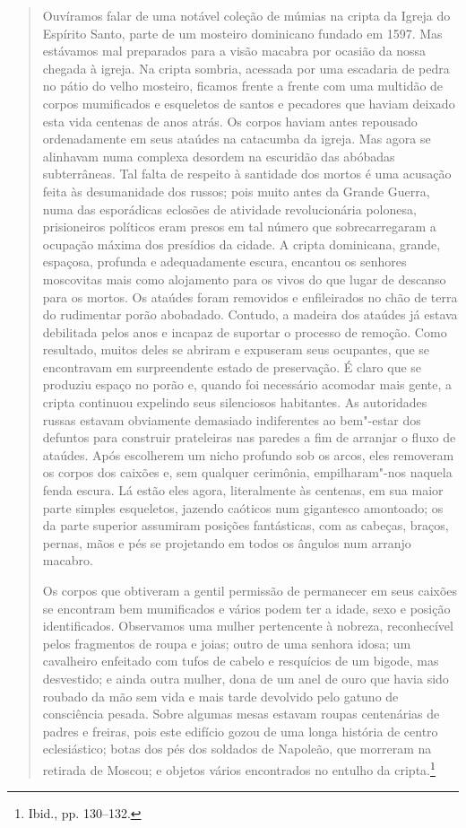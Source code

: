 \begin{quote}
Ouvíramos falar de uma notável coleção de múmias na cripta da Igreja do
Espírito Santo, parte de um mosteiro dominicano fundado em 1597. Mas
estávamos mal preparados para a visão macabra por ocasião da nossa
chegada à igreja. Na cripta sombria, acessada por uma escadaria de pedra
no pátio do velho mosteiro, ficamos frente a frente com uma multidão de
corpos mumificados e esqueletos de santos e pecadores que haviam deixado
esta vida centenas de anos atrás. Os corpos haviam antes repousado
ordenadamente em seus ataúdes na catacumba da igreja. Mas agora se
alinhavam numa complexa desordem na escuridão das abóbadas subterrâneas.
Tal falta de respeito à santidade dos mortos é uma acusação feita às
desumanidade dos russos; pois muito antes da Grande Guerra, numa das
esporádicas eclosões de atividade revolucionária polonesa, prisioneiros
políticos eram presos em tal número que sobrecarregaram a ocupação
máxima dos presídios da cidade. A cripta dominicana, grande, espaçosa,
profunda e adequadamente escura, encantou os senhores moscovitas mais
como alojamento para os vivos do que lugar de descanso para os mortos.
Os ataúdes foram removidos e enfileirados no chão de terra do rudimentar
porão abobadado. Contudo, a madeira dos ataúdes já estava debilitada
pelos anos e incapaz de suportar o processo de remoção. Como resultado,
muitos deles se abriram e expuseram seus ocupantes, que se encontravam
em surpreendente estado de preservação. É claro que se produziu espaço
no porão e, quando foi necessário acomodar mais gente, a cripta
continuou expelindo seus silenciosos habitantes. As autoridades russas
estavam obviamente demasiado indiferentes ao bem"-estar dos defuntos para
construir prateleiras nas paredes a fim de arranjar o fluxo de ataúdes.
Após escolherem um nicho profundo sob os arcos, eles removeram os corpos
dos caixões e, sem qualquer cerimônia, empilharam"-nos naquela fenda
escura. Lá estão eles agora, literalmente às centenas, em sua maior
parte simples esqueletos, jazendo caóticos num gigantesco amontoado; os
da parte superior assumiram posições fantásticas, com as cabeças,
braços, pernas, mãos e pés se projetando em todos os ângulos num arranjo
macabro.

Os corpos que obtiveram a gentil permissão de permanecer em seus caixões
se encontram bem mumificados e vários podem ter a idade, sexo e posição
identificados. Observamos uma mulher pertencente à nobreza, reconhecível
pelos fragmentos de roupa e joias; outro de uma senhora idosa; um
cavalheiro enfeitado com tufos de cabelo e resquícios de um bigode, mas
desvestido; e ainda outra mulher, dona de um anel de ouro que havia sido
roubado da mão sem vida e mais tarde devolvido pelo gatuno de
consciência pesada. Sobre algumas mesas estavam roupas centenárias de
padres e freiras, pois este edifício gozou de uma longa história de
centro eclesiástico; botas dos pés dos soldados de Napoleão, que
morreram na retirada de Moscou; e objetos vários encontrados no entulho
da cripta.\footnote{Ibid., pp. 130--132.}
\end{quote}

